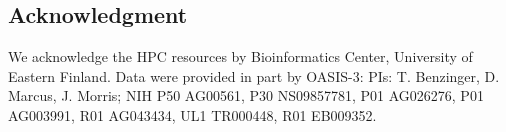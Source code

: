 \documentclass[journal,twoside,web]{ieeecolor}
\begin{document}
\subsection*{Acknowledgment}
We acknowledge the HPC resources by Bioinformatics Center, University of Eastern Finland.
Data were provided in part by OASIS-3: PIs: T. Benzinger, D. Marcus, J. Morris; NIH P50 AG00561, P30 NS09857781, P01 AG026276, P01 AG003991, R01 AG043434, UL1 TR000448, R01 EB009352.



{\small


}
\end{document}
